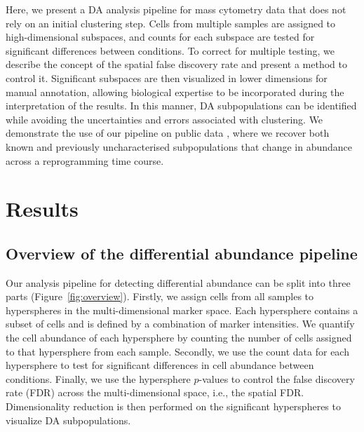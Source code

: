 \documentclass{article}
\begin{document}

Here, we present a DA analysis pipeline for mass cytometry data that does not rely on an initial clustering step.
Cells from multiple samples are assigned to high-dimensional subspaces, and counts for each subspace are tested for significant differences between conditions.
To correct for multiple testing, we describe the concept of the spatial false discovery rate and present a method to control it.
Significant subspaces are then visualized in lower dimensions for manual annotation, allowing biological expertise to be incorporated during the interpretation of the results.
In this manner, DA subpopulations can be identified while avoiding the uncertainties and errors associated with clustering.
We demonstrate the use of our pipeline on public data \cite{zunder2015continuous}, where we recover both known and previously uncharacterised subpopulations that change in abundance across a reprogramming time course.

\section{Results}
\subsection{Overview of the differential abundance pipeline}
Our analysis pipeline for detecting differential abundance can be split into three parts (Figure~\ref{fig:overview}). 
Firstly, we assign cells from all samples to hyperspheres in the multi-dimensional marker space.
Each hypersphere contains a subset of cells and is defined by a combination of marker intensities.
We quantify the cell abundance of each hypersphere by counting the number of cells assigned to that hypersphere from each sample.
Secondly, we use the count data for each hypersphere to test for significant differences in cell abundance between conditions.
Finally, we use the hypersphere $p$-values to control the false discovery rate (FDR) across the multi-dimensional space, i.e., the spatial FDR.
Dimensionality reduction is then performed on the significant hyperspheres to visualize DA subpopulations.
\end{document}
